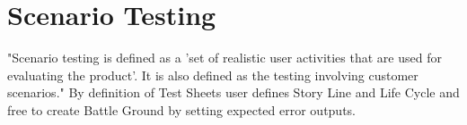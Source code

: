 \chapter{Scenario Testing}
"Scenario testing is defined as a 'set of realistic user activities that are used for evaluating the product'. It is also defined as the testing involving customer scenarios."\cite{desikan}
By definition of Test Sheets user defines Story Line\cite{desikan} and Life Cycle\cite{desikan} and free to create Battle Ground\cite{desikan} by setting expected error outputs. 
